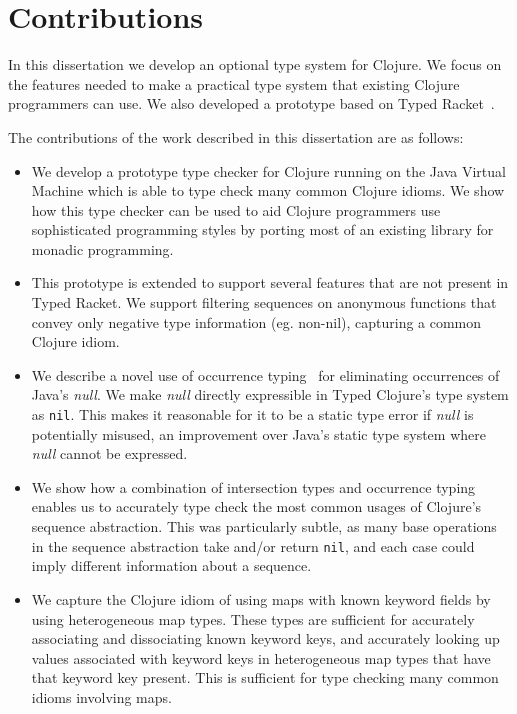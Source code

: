\section{Contributions}

In this dissertation we develop an optional type system for Clojure.
We focus on the features needed to make a practical type system that
existing Clojure programmers can use.
We also developed a prototype based on Typed Racket~\cite{Tob10}.

The contributions of the work described in this dissertation are as follows:

\begin{itemize}
  \item We develop a prototype type checker for Clojure running on the Java Virtual Machine
        which is able to type check many common Clojure idioms.
        We show how this type checker can be used to aid Clojure programmers use sophisticated
        programming styles by porting most of an existing library for monadic programming.

  \item This prototype is extended to support several features that are not present in Typed Racket.
        We support filtering sequences on anonymous functions that convey only negative type information
        (eg. non-nil), capturing a common Clojure idiom.

  \item We describe a novel use of occurrence typing~\cite{TF10} for eliminating
        occurrences of Java's \emph{null}. We make \emph{null} directly expressible
        in Typed Clojure's type system as \lstinline|nil|. This makes it reasonable for it to be a
        static type error if \emph{null} is potentially misused, an improvement over Java's static type system
        where \emph{null} cannot be expressed.

  \item We show how a combination of intersection types and occurrence typing enables us to accurately type check
        the most common usages of Clojure's sequence abstraction. This was particularly subtle, as 
        many base operations in the sequence abstraction take and/or return \lstinline|nil|, and
        each case could imply different information about a sequence.

  \item We capture the Clojure idiom of using maps with known keyword fields by using heterogeneous map types.
        These types are sufficient for accurately associating and dissociating known keyword keys,
        and accurately looking up values associated with keyword keys in heterogeneous map types that have
        that keyword key present.
        This is sufficient for type checking many common idioms involving maps.


\end{itemize}
